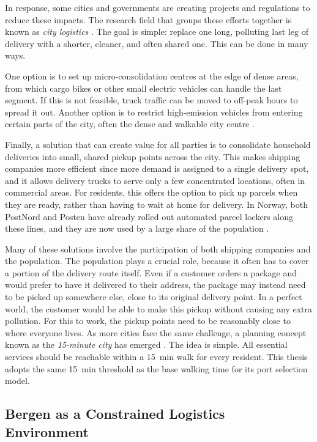 \documentclass[12pt]{article}
\begin{document}
In response, some cities and governments are creating projects and regulations to reduce these impacts. The research field that groups these efforts together is known as \textit{city logistics} \parencite{savelsbergh2016}. The goal is simple: replace one long, polluting last leg of delivery with a shorter, cleaner, and often shared one. This can be done in many ways.

One option is to set up micro-consolidation centres at the edge of dense areas, from which cargo bikes or other small electric vehicles can handle the last segment. If this is not feasible, truck traffic can be moved to off-peak hours to spread it out. Another option is to restrict high-emission vehicles from entering certain parts of the city, often the dense and walkable city centre \parencite{civitas2015}.

Finally, a solution that can create value for all parties is to consolidate household deliveries into small, shared pickup points across the city. This makes shipping companies more efficient since more demand is assigned to a single delivery spot, and it allows delivery trucks to serve only a few concentrated locations, often in commercial areas. For residents, this offers the option to pick up parcels when they are ready, rather than having to wait at home for delivery. In Norway, both PostNord and Posten have already rolled out automated parcel lockers along these lines, and they are now used by a large share of the population \parencite{toiparcellockers,posten_hours,portnord_hours}.

Many of these solutions involve the participation of both shipping companies and the population. The population plays a crucial role, because it often has to cover a portion of the delivery route itself. Even if a customer orders a package and would prefer to have it delivered to their address, the package may instead need to be picked up somewhere else, close to its original delivery point. In a perfect world, the customer would be able to make this pickup without causing any extra pollution. For this to work, the pickup points need to be reasonably close to where everyone lives. As more cities face the same challenge, a planning concept known as the \textit{15-minute city} has emerged \parencite{moreno2021}. The idea is simple. All essential services should be reachable within a \qty{15}{\minute} walk for every resident. This thesis adopts the same \qty{15}{\minute} threshold as the base walking time for its port selection model.

\subsection{Bergen as a Constrained Logistics Environment}
\label{subsec:bergen}
\end{document}
